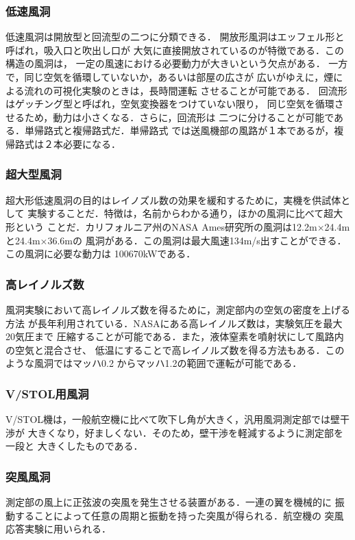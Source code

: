 \documentclass[a4paper,titlepage]{ltjsarticle}
\begin{document}
\subsubsection{低速風洞}
 低速風洞は開放型と回流型の二つに分類できる．
開放形風洞はエッフェル形と呼ばれ，吸入口と吹出し口が
大気に直接開放されているのが特徴である．この構造の風洞は，
一定の風速における必要動力が大きいという欠点がある．
一方で，同じ空気を循環していないか，あるいは部屋の広さが
広いがゆえに，煙による流れの可視化実験のときは，長時間運転
させることが可能である．
回流形はゲッチング型と呼ばれ，空気変換器をつけていない限り，
同じ空気を循環させるため，動力は小さくなる．さらに，回流形は
二つに分けることが可能である．単帰路式と複帰路式だ．単帰路式
では送風機部の風路が１本であるが，複帰路式は２本必要になる．

\subsubsection{超大型風洞}
 超大形低速風洞の目的はレイノズル数の効果を緩和するために，実機を供試体として
 実験することだ．特徴は，名前からわかる通り，ほかの風洞に比べて超大形という
 ことだ．カリフォルニア州のNASA Ames研究所の風洞は12.2m×24.4mと24.4m×36.6mの
 風洞がある．この風洞は最大風速134m/s出すことができる．この風洞に必要な動力は
 100670kWである．

\subsubsection{高レイノルズ数}
 風洞実験において高レイノルズ数を得るために，測定部内の空気の密度を上げる方法
 が長年利用されている．NASAにある高レイノルズ数は，実験気圧を最大20気圧まで
 圧縮することが可能である．また，液体窒素を噴射状にして風路内の空気と混合させ、
 低温にすることで高レイノルズ数を得る方法もある．このような風洞ではマッハ0.2
 からマッハ1.2の範囲で運転が可能である．

\subsubsection{V/STOL用風洞}
 V/STOL機は，一般航空機に比べて吹下し角が大きく，汎用風洞測定部では壁干渉が
 大きくなり，好ましくない．そのため，壁干渉を軽減するように測定部を一段と
 大きくしたものである．

\subsubsection{突風風洞}
 測定部の風上に正弦波の突風を発生させる装置がある．一連の翼を機械的に
 振動することによって任意の周期と振動を持った突風が得られる．航空機の
 突風応答実験に用いられる．
\end{document}
